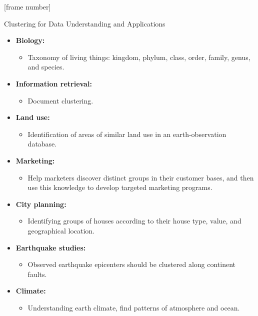 \documentclass[aspectratio=169,t,xcolor=dvipsnames]{beamer}
\begin{document}
  {
    [frame number]
    \begin{frame}{Clustering for Data Understanding and Applications}
        \begin{itemize}
          \item \textbf{Biology:}
          \begin{itemize}
            \item Taxonomy of living things: kingdom, phylum, class, order, family, genus, and species.
          \end{itemize}
          \item \textbf{Information retrieval:}
          \begin{itemize}
            \item Document clustering.
          \end{itemize}
          \item \textbf{Land use:}
          \begin{itemize}
            \item Identification of areas of similar land use in an earth-observation database.
          \end{itemize}
          \item \textbf{Marketing:}
          \begin{itemize}
            \item Help marketers discover distinct groups in their customer bases, and then use this knowledge to develop targeted marketing programs.
          \end{itemize}
          \item \textbf{City planning:}
          \begin{itemize}
            \item Identifying groups of houses according to their house type, value, and geographical location.
          \end{itemize}
          \item \textbf{Earthquake studies:}
          \begin{itemize}
            \item Observed earthquake epicenters should be clustered along continent faults.
          \end{itemize}
          \item \textbf{Climate:}
          \begin{itemize}
            \item Understanding earth climate, find patterns of atmosphere and ocean.
          \end{itemize}
        \end{itemize}
    \end{frame}
  }
\end{document}
